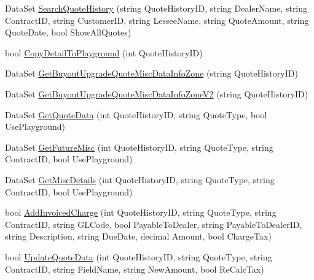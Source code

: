 \begin{DoxyCompactItemize}
\item 
Data\+Set \mbox{\hyperlink{class_g_f_s_c_1_1_services_1_1_end_of_term_1_1_end_of_term_service_aa8f37073fd1d73780f2161df2e28c841}{Search\+Quote\+History}} (string Quote\+History\+ID, string Dealer\+Name, string Contract\+ID, string Customer\+ID, string Lessee\+Name, string Quote\+Amount, string Quote\+Date, bool Show\+All\+Quotes)
\item 
bool \mbox{\hyperlink{class_g_f_s_c_1_1_services_1_1_end_of_term_1_1_end_of_term_service_a5366a3097a6bfc47cb1d891ee568def0}{Copy\+Detail\+To\+Playground}} (int Quote\+History\+ID)
\item 
Data\+Set \mbox{\hyperlink{class_g_f_s_c_1_1_services_1_1_end_of_term_1_1_end_of_term_service_af019d207cbd168f64321133b1c27abcb}{Get\+Buyout\+Upgrade\+Quote\+Misc\+Data\+Info\+Zone}} (string Quote\+History\+ID)
\item 
Data\+Set \mbox{\hyperlink{class_g_f_s_c_1_1_services_1_1_end_of_term_1_1_end_of_term_service_ae1b4b3ff075bbde23ef2eb71cf476c0b}{Get\+Buyout\+Upgrade\+Quote\+Misc\+Data\+Info\+Zone\+V2}} (string Quote\+History\+ID)
\item 
Data\+Set \mbox{\hyperlink{class_g_f_s_c_1_1_services_1_1_end_of_term_1_1_end_of_term_service_a1585a6265f11c071d2fed688d061d309}{Get\+Quote\+Data}} (int Quote\+History\+ID, string Quote\+Type, bool Use\+Playground)
\item 
Data\+Set \mbox{\hyperlink{class_g_f_s_c_1_1_services_1_1_end_of_term_1_1_end_of_term_service_a85f101106bab16276e26282be54a072d}{Get\+Future\+Misc}} (int Quote\+History\+ID, string Quote\+Type, string Contract\+ID, bool Use\+Playground)
\item 
Data\+Set \mbox{\hyperlink{class_g_f_s_c_1_1_services_1_1_end_of_term_1_1_end_of_term_service_a22f28f2e4af65d0da0df099bba404ccb}{Get\+Misc\+Details}} (int Quote\+History\+ID, string Quote\+Type, string Contract\+ID, bool Use\+Playground)
\item 
bool \mbox{\hyperlink{class_g_f_s_c_1_1_services_1_1_end_of_term_1_1_end_of_term_service_a0fa838b19293a8dfdfe4a447088c3420}{Add\+Invoiced\+Charge}} (int Quote\+History\+ID, string Quote\+Type, string Contract\+ID, string G\+L\+Code, bool Payable\+To\+Dealer, string Payable\+To\+Dealer\+ID, string Description, string Due\+Date, decimal Amount, bool Charge\+Tax)
\item 
bool \mbox{\hyperlink{class_g_f_s_c_1_1_services_1_1_end_of_term_1_1_end_of_term_service_aac836613e660d4d80c5467852fa053ec}{Update\+Quote\+Data}} (int Quote\+History\+ID, string Quote\+Type, string Contract\+ID, string Field\+Name, string New\+Amount, bool Re\+Calc\+Tax)

\end{DoxyCompactItemize}
